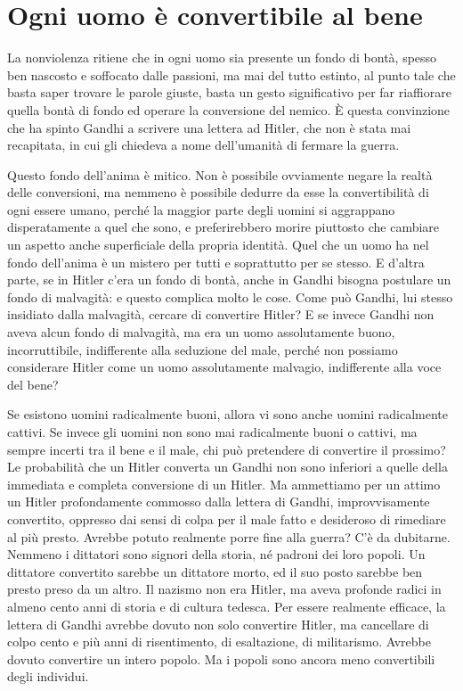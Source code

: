 \documentclass[12pt,oneside,openany]{book}
\begin{document}
\setcounter{chapter}{3}\addtocounter{chapter}{-1}

\chapter{Ogni uomo è convertibile al bene}

La nonviolenza ritiene che in ogni uomo sia presente un fondo di bontà, spesso ben nascosto e soffocato dalle passioni, ma mai del tutto estinto, al punto tale che basta saper trovare le parole giuste, basta un gesto significativo per far riaffiorare quella bontà di fondo ed operare la conversione del nemico. È questa convinzione che ha spinto Gandhi a scrivere una lettera ad Hitler, che non è stata mai recapitata, in cui gli chiedeva a nome dell'umanità di fermare la guerra.



Questo fondo dell'anima è mitico. Non è possibile ovviamente negare la realtà delle conversioni, ma nemmeno è possibile dedurre da esse la convertibilità di ogni essere umano, perché la maggior parte degli uomini si aggrappano disperatamente a quel che sono, e preferirebbero morire piuttosto che cambiare un aspetto anche superficiale della propria identità. Quel che un uomo ha nel fondo dell'anima è un mistero per tutti e soprattutto per se stesso. E d'altra parte, se in Hitler c'era un fondo di bontà, anche in Gandhi bisogna postulare un fondo di malvagità: e questo complica molto le cose. Come può Gandhi, lui stesso insidiato dalla malvagità, cercare di convertire Hitler? E se invece Gandhi non aveva alcun fondo di malvagità, ma era un uomo assolutamente buono, incorruttibile, indifferente alla seduzione del male, perché non possiamo considerare Hitler come un uomo assolutamente malvagio, indifferente alla voce del bene?



Se esistono uomini radicalmente buoni, allora vi sono anche uomini radicalmente cattivi. Se invece gli uomini non sono mai radicalmente buoni o cattivi, ma sempre incerti tra il bene e il male, chi può pretendere di convertire il prossimo? Le probabilità che un Hitler converta un Gandhi non sono inferiori a quelle della immediata e completa conversione di un Hitler. Ma ammettiamo per un attimo un Hitler profondamente commosso dalla lettera di Gandhi, improvvisamente convertito, oppresso dai sensi di colpa per il male fatto e desideroso di rimediare al più presto. Avrebbe potuto realmente porre fine alla guerra? C'è da dubitarne. Nemmeno i dittatori sono signori della storia, né padroni dei loro popoli. Un dittatore convertito sarebbe un dittatore morto, ed il suo posto sarebbe ben presto preso da un altro. Il nazismo non era Hitler, ma aveva profonde radici in almeno cento anni di storia e di cultura tedesca. Per essere realmente efficace, la lettera di Gandhi avrebbe dovuto non solo convertire Hitler, ma cancellare di colpo cento e più anni di risentimento, di esaltazione, di militarismo. Avrebbe dovuto convertire un intero popolo. Ma i popoli sono ancora meno convertibili degli individui.
\end{document}
